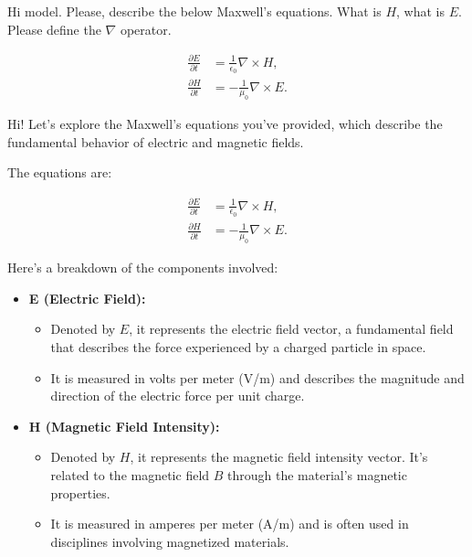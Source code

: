 \begin{ai}

Hi model. Please, describe the below Maxwell's equations. What is $H$, what is $E$. Please define
the $\nabla$ operator.

\[
\begin{aligned}
  \frac{\partial E}{\partial t} &= \frac{1}{\epsilon_0} \nabla \times H, \\
  \frac{\partial H}{\partial t} &= -\frac{1}{\mu_0} \nabla \times E.
\end{aligned}
\]

\end{ai}

\begin{airesult}
Hi! Let's explore the Maxwell's equations you've provided, which describe the fundamental behavior
of electric and magnetic fields.

\vsp

The equations are:

\[
\begin{aligned}
  \frac{\partial E}{\partial t} &= \frac{1}{\epsilon_0} \nabla \times H, \\
  \frac{\partial H}{\partial t} &= -\frac{1}{\mu_0} \nabla \times E.
\end{aligned}
\]

\vsp

Here's a breakdown of the components involved:

\begin{itemize}
\item \textbf{E (Electric Field):}

  \begin{itemize}
  \item Denoted by \( E \), it represents the electric field vector, a fundamental field that
describes the force experienced by a charged particle in space.
  \item It is measured in volts per meter (V/m) and describes the magnitude and direction of the
electric force per unit charge.
  \end{itemize}

\item \textbf{H (Magnetic Field Intensity):}

  \begin{itemize}
  \item Denoted by \( H \), it represents the magnetic field intensity vector. It's related to the
magnetic field \( B \) through the material's magnetic properties.
  \item It is measured in amperes per meter (A/m) and is often used in disciplines involving
magnetized materials.
  \end{itemize}


\end{itemize}
\end{airesult}
